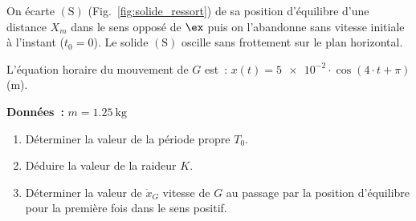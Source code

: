 On écarte $\mathrm{(S)}$ (Fig.~\ref{fig:solide_ressort}) de sa position
d'équilibre d'une distance $X_m$ dans le sens opposé de $\ex$ puis on
l'abandonne sans vitesse initiale à l'instant ($t_0=0$). Le solide
$\mathrm{(S)}$ oscille sans frottement sur le plan horizontal.

L'équation horaire du mouvement de $G$ est~:
${x(t)=\num{5e-2}\cdot\cos(4\cdot t+\pi)}$ (\unit{\meter}).

\textbf{Données~:} $m=\qty{1.25}{\kg}$

\begin{enumerate}
    \item Déterminer la valeur de la période propre $T_0$.
    \item Déduire la valeur de la raideur $K$.
    \item Déterminer la valeur de $\dot{x}_G$ vitesse de $G$ au passage par la
          position d'équilibre pour la première fois dans le sens positif.
\end{enumerate}
